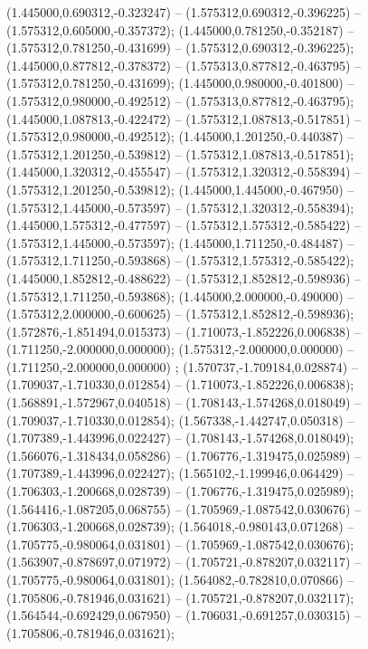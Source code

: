  (1.445000,0.690312,-0.323247) -- (1.575312,0.690312,-0.396225) -- (1.575312,0.605000,-0.357372);
 (1.445000,0.781250,-0.352187) -- (1.575312,0.781250,-0.431699) -- (1.575312,0.690312,-0.396225);
 (1.445000,0.877812,-0.378372) -- (1.575313,0.877812,-0.463795) -- (1.575312,0.781250,-0.431699);
 (1.445000,0.980000,-0.401800) -- (1.575312,0.980000,-0.492512) -- (1.575313,0.877812,-0.463795);
 (1.445000,1.087813,-0.422472) -- (1.575312,1.087813,-0.517851) -- (1.575312,0.980000,-0.492512);
 (1.445000,1.201250,-0.440387) -- (1.575312,1.201250,-0.539812) -- (1.575312,1.087813,-0.517851);
 (1.445000,1.320312,-0.455547) -- (1.575312,1.320312,-0.558394) -- (1.575312,1.201250,-0.539812);
 (1.445000,1.445000,-0.467950) -- (1.575312,1.445000,-0.573597) -- (1.575312,1.320312,-0.558394);
 (1.445000,1.575312,-0.477597) -- (1.575312,1.575312,-0.585422) -- (1.575312,1.445000,-0.573597);
 (1.445000,1.711250,-0.484487) -- (1.575312,1.711250,-0.593868) -- (1.575312,1.575312,-0.585422);
 (1.445000,1.852812,-0.488622) -- (1.575312,1.852812,-0.598936) -- (1.575312,1.711250,-0.593868);
 (1.445000,2.000000,-0.490000) -- (1.575312,2.000000,-0.600625) -- (1.575312,1.852812,-0.598936);
 (1.572876,-1.851494,0.015373) -- (1.710073,-1.852226,0.006838) -- (1.711250,-2.000000,0.000000);
 (1.575312,-2.000000,0.000000) -- (1.711250,-2.000000,0.000000) ;
 (1.570737,-1.709184,0.028874) -- (1.709037,-1.710330,0.012854) -- (1.710073,-1.852226,0.006838);
 (1.568891,-1.572967,0.040518) -- (1.708143,-1.574268,0.018049) -- (1.709037,-1.710330,0.012854);
 (1.567338,-1.442747,0.050318) -- (1.707389,-1.443996,0.022427) -- (1.708143,-1.574268,0.018049);
 (1.566076,-1.318434,0.058286) -- (1.706776,-1.319475,0.025989) -- (1.707389,-1.443996,0.022427);
 (1.565102,-1.199946,0.064429) -- (1.706303,-1.200668,0.028739) -- (1.706776,-1.319475,0.025989);
 (1.564416,-1.087205,0.068755) -- (1.705969,-1.087542,0.030676) -- (1.706303,-1.200668,0.028739);
 (1.564018,-0.980143,0.071268) -- (1.705775,-0.980064,0.031801) -- (1.705969,-1.087542,0.030676);
 (1.563907,-0.878697,0.071972) -- (1.705721,-0.878207,0.032117) -- (1.705775,-0.980064,0.031801);
 (1.564082,-0.782810,0.070866) -- (1.705806,-0.781946,0.031621) -- (1.705721,-0.878207,0.032117);
 (1.564544,-0.692429,0.067950) -- (1.706031,-0.691257,0.030315) -- (1.705806,-0.781946,0.031621);
